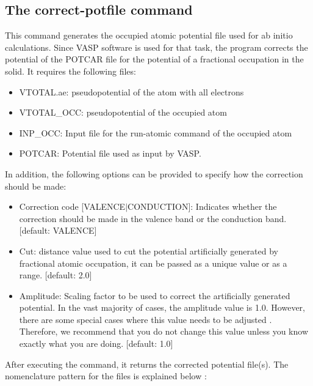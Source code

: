 \subsection{The correct-potfile command}
This command generates the occupied atomic potential file used for ab initio calculations. Since VASP software is used for that task, the program corrects the potential of the POTCAR file for the potential of a fractional occupation in the solid. It requires the following files:

\begin{itemize}
    \item VTOTAL.ae: pseudopotential of the atom with all electrons
    
    \item VTOTAL\_OCC: pseudopotential of the occupied atom
    
    \item INP\_OCC: Input file for the run-atomic command of the occupied atom
    
    \item  POTCAR: Potential file used as input by VASP.

\end{itemize}

In addition, the following options can be provided to specify how the correction should be made:

\begin{itemize}
    \item Correction code [VALENCE$\mid$CONDUCTION]: Indicates whether the correction should be made in the valence band or the conduction band.  [default: VALENCE]
    
    \item Cut: distance value used to cut the potential artificially generated by fractional atomic occupation, it can be passed as a unique value or as a range. [default: 2.0]
    
    \item Amplitude: Scaling factor to be used to correct the artificially generated potential. In the vast majority of cases, the amplitude value is 1.0. However, there are some special cases where this value needs to be adjusted \cite{PhysRevB.95.045126}. Therefore, we recommend that you do not change this value unless you know exactly what you are doing. [default: 1.0]
\end{itemize}

After executing the command, it returns the corrected potential file(s). The nomenclature pattern for the files is explained below :


